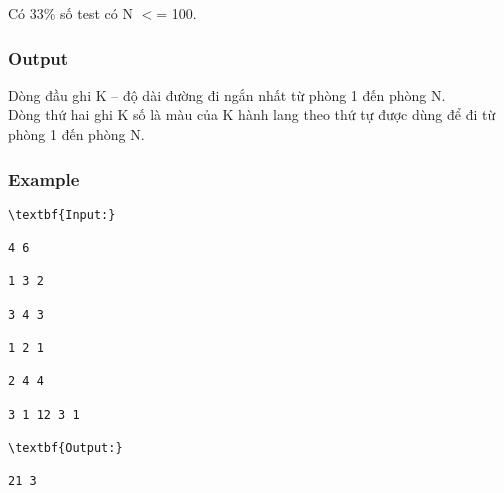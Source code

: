    Có 33\% số test có N $<$= 100.  

\subsubsection{   Output  }

   Dòng đầu ghi K – độ dài đường đi ngắn nhất từ phòng 1 đến phòng N.   
\\   Dòng thứ hai ghi K số là màu của K hành lang theo thứ tự được dùng để đi từ phòng 1 đến phòng N.  

\subsubsection{   Example  }
\begin{verbatim}
\textbf{Input:}

4 6

1 3 2

3 4 3

1 2 1

2 4 4

3 1 12 3 1 

\textbf{Output:}

21 3\end{verbatim}